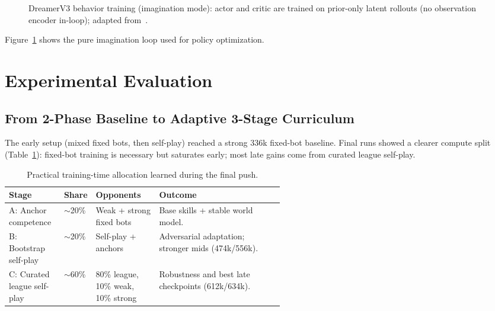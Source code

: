 \documentclass[11pt]{article}
\begin{document}
\begin{figure}[htbp]
{
}
\caption{DreamerV3 behavior training (imagination mode): actor and critic are trained on prior-only latent rollouts (no observation encoder in-loop); adapted from~\cite{hafner2024,naturaldreamer}.}
\label{fig:behavior_training}
\end{figure}

Figure~\ref{fig:behavior_training} shows the pure imagination loop used for policy optimization.

\section{Experimental Evaluation}\label{sec:experiments}

\subsection{From 2-Phase Baseline to Adaptive 3-Stage Curriculum}

The early setup (mixed fixed bots, then self-play) reached a strong 336k fixed-bot baseline. Final runs showed a clearer compute split (Table~\ref{tab:training-phases}): fixed-bot training is necessary but saturates early; most late gains come from curated league self-play.

\begin{table}[h]
\centering
\footnotesize
\setlength{\tabcolsep}{3pt}
\renewcommand{\arraystretch}{0.96}
\begin{tabularx}{\linewidth}{@{}p{0.20\linewidth}p{0.11\linewidth}p{0.23\linewidth}X@{}}
\toprule
\textbf{Stage} & \textbf{Share} & \textbf{Opponents} & \textbf{Outcome} \\
\midrule
A: Anchor competence & $\sim$20\% & Weak + strong fixed bots & Base skills + stable world model. \\
B: Bootstrap self-play & $\sim$20\% & Self-play + anchors & Adversarial adaptation; stronger mids (474k/556k). \\
C: Curated league self-play & $\sim$60\% & 80\% league, 10\% weak, 10\% strong & Robustness and best late checkpoints (612k/634k). \\
\bottomrule
\end{tabularx}
\caption{Practical training-time allocation learned during the final push.}
\label{tab:training-phases}
\end{table}
\end{document}
